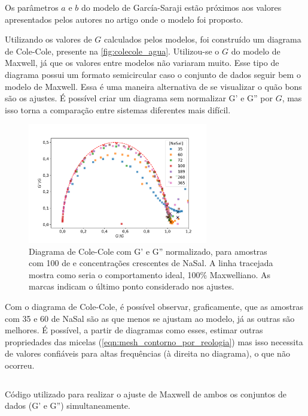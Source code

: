 	Os parâmetros \(a\) e \(b\) do modelo de García-Saraji estão próximos aos valores apresentados pelos autores no artigo onde o modelo foi proposto.\cite{Garcia2018}
	
	Utilizando os valores de \(G\) calculados pelos modelos, foi construído um diagrama de Cole-Cole, presente na \autoref{fig:colecole_agua}. Utilizou-se o \(G\) do modelo de Maxwell, já que os valores entre modelos não variaram muito. Esse tipo de diagrama possui um formato semicircular caso o conjunto de dados seguir bem o modelo de Maxwell. Essa é uma maneira alternativa de se visualizar o quão bons são os ajustes. É possível criar um diagrama sem normalizar G' e G'' por \(G\), mas isso torna a comparação entre sistemas diferentes mais difícil.

		\begin{figure}
			\centering
			\includegraphics[width=0.7\textwidth]{imagens/reologia/colecole_agua}
			\caption{Diagrama de Cole-Cole com G' e G'' normalizado, para amostras com 100 \mM{} de \CTAB{} e concentrações crescentes de NaSal. A linha tracejada mostra como seria o comportamento ideal, 100\% Maxwelliano. As marcas indicam o último ponto considerado nos ajustes.}
			\label{fig:colecole_agua}
		\end{figure} 

	Com o diagrama de Cole-Cole, é possível observar, graficamente, que as amostras com 35 e 60 \mM{} de NaSal são as que menos se ajustam ao modelo, já as outras são melhores. É possível, a partir de diagramas como esses, estimar outras propriedades das micelas (\autoref{eqn:mesh_contorno_por_reologia}) mas isso necessita de valores confiáveis para altas frequências (à direita no diagrama), o que não ocorreu.
	
	\begin{listing}[h]
		\inputminted{python}{./python/ajuste_maxwell.py}
		\caption{Código utilizado para realizar o ajuste de Maxwell de ambos os conjuntos de dados (G' e G'') simultaneamente.}
		\label{lst:ajuste_maxwell}
	\end{listing}
	
